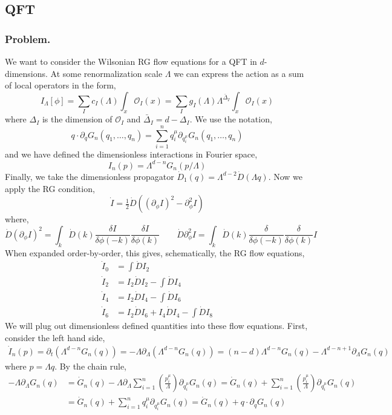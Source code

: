\documentclass[12pt]{article}
\begin{document}
\subsection{QFT}

\subsubsection{Problem.}

We want to consider the Wilsonian RG flow equations for a QFT in $d$-dimensions. At some renormalization scale $\Lambda$ we can express the action as a sum of local operators in the form,
\[ I_{\Lambda}[\phi] = \sum_{I} c_I(\Lambda) \int_x \mathcal{O}_I(x) = \sum_I g_I(\Lambda) \Lambda^{\bar{\Delta}_I} \int_x \mathcal{O}_I(x) \]
where $\Delta_I$ is the dimension of $\mathcal{O}_I$ and $\bar{\Delta}_I = d - \Delta_I$.  We use the notation,
\[ q \cdot \partial_q G_n(q_1, \dots, q_n) = \sum_{i = 1}^n q_i^\mu \partial_{q_i^\mu} G_n(q_1, \dots, q_n) \]
and we have defined the dimensionless interactions in Fourier space,
\[ I_n(p) = \Lambda^{d - n} G_n(p / \Lambda) \]
Finally, we take the dimensionless propagator $\dot{D}_1(q) = \Lambda^{d - 2} \dot{D}(\Lambda q)$.
Now we apply the RG condition,
\[ \dot{I} = \tfrac{1}{2} \dot{D} \left( (\partial_\phi I)^2 - \partial^2_\phi I \right) \]
where,
\[ \dot{D} (\partial_\phi I)^2 = \int_k \dot{D}(k) \frac{\delta I}{\delta \phi(-k)} \frac{\delta I}{\delta \phi(k)} \quad \quad \dot{D} \partial^2_\phi I = \int_k \dot{D}(k) \frac{\delta}{\delta \phi(-k)} \frac{\delta}{\delta \phi(k)} I \]
When expanded order-by-order, this gives, schematically, the RG flow equations,
\begin{align*}
\dot{I}_0 & = \int \dot{D} I_2
\\
\dot{I}_2 & = I_2 \dot{D} I_2 - \int \dot{D} I_4
\\
\dot{I}_4 & = I_2 \dot{D} I_4 - \int \dot{D} I_6
\\
\dot{I}_6 & = I_2 \dot{D} I_6 + I_4 \dot{D} I_4 - \int \dot{D} I_8
\end{align*}
We will plug out dimensionless defined quantities into these flow equations. First, consider the left hand side,
\begin{align*}
\dot{I}_n(p) = \partial_t (\Lambda^{d - n} G_n(q)) = - \Lambda \partial_{\Lambda} (\Lambda^{d - n} G_n(q)) = (n  - d) \Lambda^{d - n} G_n(q) - \Lambda^{d - n + 1} \partial_\Lambda G_n(q) 
\end{align*}
where $p = \Lambda q$. By the chain rule,
\begin{align*}
- \Lambda \partial_{\Lambda} G_n(q) & = \dot{G}_n(q) - \Lambda \partial_{\Lambda} \sum_{i = 1}^n \left( \frac{p_i^\mu}{\Lambda} \right) \partial_{q_i^\mu} G_n(q) = \dot{G}_n(q) + \sum_{i = 1}^n \left( \frac{p_i^\mu}{\Lambda} \right) \partial_{q_i^\mu} G_n(q)
\\
& = \dot{G}_n(q) + \sum_{i = 1}^n q_i^\mu \partial_{q_i^\mu} G_n(q) = \dot{G}_n(q) + q \cdot \partial_q G_n(q)
\end{align*}
\end{document}
